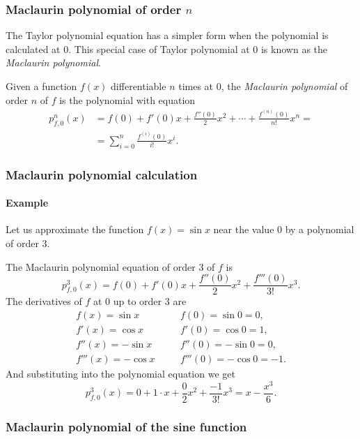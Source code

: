\begin{frame}
\frametitle{Maclaurin polynomial of order $n$}
The Taylor polynomial equation has a simpler form when the polynomial is calculated at $0$.
This special case of Taylor polynomial at $0$ is known as the \emph{Maclaurin polynomial}.
\begin{definition}
Given a function $f(x)$ differentiable $n$ times at $0$, the \emph{Maclaurin polynomial} of order $n$ of $f$ is the polynomial with equation
\begin{align*}
p_{f,0}^n(x)&=f(0)+f'(0)x+\frac{f''(0)}{2}x^2+\cdots +\frac{f^{(n)}(0)}{n!}x^n = \\ &=\sum_{i=0}^{n}\frac{f^{(i)}(0)}{i!}x^i.
\end{align*}
\end{definition}
\end{frame}


\begin{frame}
\frametitle{Maclaurin polynomial calculation}
\framesubtitle{Example}
Let us approximate the function $f(x)=\sin x$ near the value $0$ by a polynomial of order $3$.

The Maclaurin polynomial equation of order $3$ of $f$ is
\[
p_{f,0}^3(x)=f(0)+f'(0)x+\frac{f''(0)}{2}x^2+\frac{f'''(0)}{3!}x^3.
\]
The derivatives of $f$ at $0$ up to order $3$ are
\[
\begin{array}{lll}
f(x)=\sin x & \quad & f(0)=\sin 0 =0,\\
f'(x)=\cos x & & f'(0)=\cos 0=1,\\
f''(x)=-\sin x & & f''(0)=-\sin 0=0,\\
f'''(x)=-\cos x & & f'''(0)=-\cos 0=-1.
\end{array}
\]
And substituting into the polynomial equation we get
\[
p_{f,0}^3(x)=0+1\cdot x+\frac{0}{2}x^2+\frac{-1}{3!}x^3= x-\frac{x^3}{6}.
\]
\end{frame}


\begin{frame}
\frametitle{Maclaurin polynomial of the sine function}
\begin{center}

\end{center}
\end{frame}


